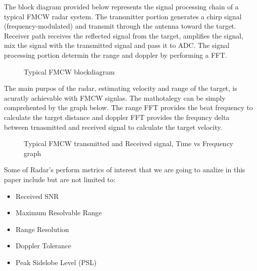 \documentclass[conference]{IEEEtran}
\begin{document}
 The block diagram provided below represents the signal processing chain of a typical FMCW radar system. The transmitter portion generates a chirp signal (frequency-modulated) and transmit through the antenna toward the target. Receiver path receives the reflected signal from the target, amplifies the signal, mix the signal with the transmitted signal and pass it to ADC. The signal processing portion determin the range and doppler by performing a FFT.

	\begin{figure}[H]
    		\centering
    		\caption{Typical FMCW blockdiagram \cite{9613183}}
	\end{figure}
	
The main purpos of the radar, estimating velocity and range of the target, is acuratly achievable with FMCW signlas. The mathotalegy can be simply comprehented by the graph below. The range FFT provides the beat frequency to calculate the target distance and doppler FFT provides the frequncy delta between trnasmitted and received signal to calculate the target velocity. 
	
	\begin{figure}[H]
    		\centering
    		\caption{Typical FMCW transmitted and Received signal, Time vs Frequency graph \cite{Long2019AssistingTV}}
	\end{figure}
	

Some of Radar's perform metrics of interest that we are going to analize in this paper include but are not limited to:

\begin{itemize}
\item Received SNR
\item Maximum Resolvable Range
\item Range Resolution
\item Doppler Tolerance
\item Peak Sidelobe Level (PSL)
\end{itemize}
\end{document}

